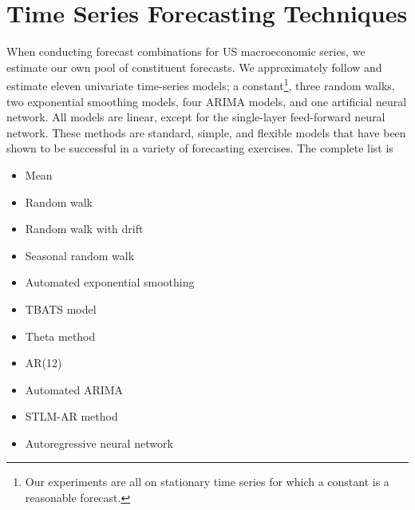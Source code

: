 \documentclass[12pt]{article}
\begin{document}
\section{Time Series Forecasting Techniques}\label{app:TimeSeriesModels}
When conducting forecast combinations for US macroeconomic series, we estimate our own pool of constituent forecasts. We approximately follow \citeauthor{MMAHT2018} and estimate eleven univariate time-series models; a constant\footnote{Our experiments are all on stationary time series for which a constant is a reasonable forecast.}, three random walks, two exponential smoothing models, four ARIMA models, and one artificial neural network. All models are linear, except for the single-layer feed-forward neural network. These methods are standard, simple, and flexible models that have been shown to be successful in a variety of forecasting exercises. The complete list is

\begin{itemize}
    \item Mean %
    \item Random walk %
    \item Random walk with drift %
    \item Seasonal random walk %
    \item Automated exponential smoothing %
    \item TBATS model %
    \item Theta method %
    \item AR(12)
    \item Automated ARIMA %
    \item STLM-AR method %
    \item Autoregressive neural network %
\end{itemize}


\end{document}
